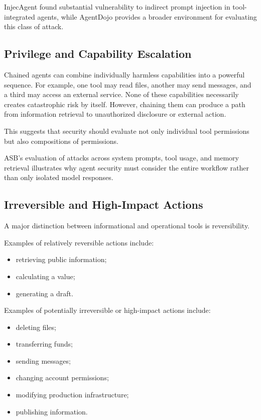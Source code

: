 \documentclass[11pt]{article}
\begin{document}
InjecAgent found substantial vulnerability to indirect prompt injection in
tool-integrated agents, while AgentDojo provides a broader environment for
evaluating this class of attack.

\subsection{Privilege and Capability Escalation}

Chained agents can combine individually harmless capabilities into a powerful sequence.
For example, one tool may read files, another may send messages, and a third may
access an external service. None of these capabilities necessarily creates
catastrophic risk by itself. However, chaining them can produce a path from
information retrieval to unauthorized disclosure or external action.

This suggests that security should evaluate not only individual tool permissions but also compositions
of permissions.

ASB's evaluation of attacks across system prompts, tool usage, and memory
retrieval illustrates why agent security must consider the entire workflow rather than
only isolated model responses.

\subsection{Irreversible and High-Impact Actions}

A major distinction between informational and operational tools is reversibility.

Examples of relatively reversible actions include:
\begin{itemize}[noitemsep]
    \item retrieving public information;
    \item calculating a value;
    \item generating a draft.
\end{itemize}

Examples of potentially irreversible or high-impact actions include:
\begin{itemize}[noitemsep]
    \item deleting files;
    \item transferring funds;
    \item sending messages;
    \item changing account permissions;
    \item modifying production infrastructure;
    \item publishing information.
\end{itemize}
\end{document}
